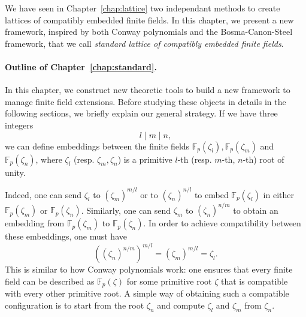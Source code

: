 We have seen in Chapter~\ref{chap:lattice} two independant methods to create
lattices of compatibly embedded finite fields. In this chapter, we present a new
framework, inspired by both Conway polynomials and the Bosma-Canon-Steel
framework, that we call \emph{standard lattice of compatibly embedded finite
fields}.
\minitoc


\clearpage

\paragraph{Outline of Chapter~\ref{chap:standard}.} In this chapter, we
construct new theoretic tools to build a new framework to manage finite
field extensions. Before studying these objects in details in the following
sections, we briefly explain our general strategy. If we have three integers
\[
  l\mid m\mid n,
\]
we can define embeddings between the finite fields
$\mathbb{F}_{p}(\zeta_l), \mathbb{F}_{p}(\zeta_m)$ and
$\mathbb{F}_{p}(\zeta_n)$, where $\zeta_l$ (resp. $\zeta_m, \zeta_n$) is a
primitive $l$-th (resp. $m$-th, $n$-th) root of unity.
\begin{center}
\end{center}
Indeed, one can send $\zeta_l$ to $(\zeta_m)^{m/l}$ or to $(\zeta_n)^{n/l}$ to
embed $\mathbb{F}_p(\zeta_l)$ in either $\mathbb{F}_{p}(\zeta_m)$ or
$\mathbb{F}_p(\zeta_n)$. Similarly, one can send $\zeta_m$ to
$(\zeta_n)^{n/m}$ to obtain an embedding from $\mathbb{F}_{p}(\zeta_m)$ to
$\mathbb{F}_p(\zeta_n)$. In order to achieve compatibility between these
embeddings, one must have
\[
  ((\zeta_n)^{n/m})^{m/l} = (\zeta_m)^{m/l} = \zeta_l.
\]
This is similar to how Conway polynomials work: one
ensures that every finite field can be described as $\mathbb{F}_{p}(\zeta)$ for
some primitive root $\zeta$ that is compatible with every other primitive root.
A simple way of obtaining such a compatible configuration is to start from the root
$\zeta_n$ and compute $\zeta_l$ and $\zeta_m$ from $\zeta_n$.

